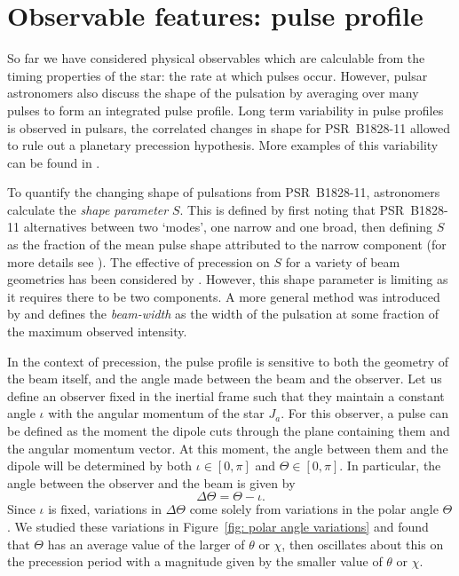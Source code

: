 \documentclass[../full_thesis/full_thesis.tex]{subfiles}
\begin{document}
\section{Observable features: pulse profile}
\label{sec: observable features: shape}

So far we have considered physical observables which are calculable from the
timing properties of the star: the rate at which pulses occur. However, pulsar
astronomers also discuss the shape of the pulsation by averaging over many
pulses to form an integrated pulse profile.  Long term variability in pulse
profiles is observed in pulsars, the correlated changes in shape for
PSR~B1828-11 allowed \citet{Stairs2000} to rule out a planetary precession
hypothesis. More examples of this variability can be found in \citet{Lyne2010}.

To quantify the changing shape of pulsations from PSR~B1828-11, astronomers
calculate the \emph{shape parameter} $S$. This is defined by first noting that
PSR~B1828-11 alternatives between two `modes', one narrow and one broad, then
defining $S$ as the fraction of the mean pulse shape attributed to the narrow
component (for more details see \citet{Stairs2003}). The effective of
precession on $S$ for a variety of beam geometries has been considered by
\citet{Akgun2006}.  However, this shape parameter is limiting as it requires
there to be two components.  A more general method was introduced by
\citet{Lyne2010} and defines the \emph{beam-width} as the width of the
pulsation at some fraction of the maximum observed intensity.

In the context of precession, the pulse profile is sensitive to both the
geometry of the beam itself, and the angle made between the beam and the
observer.  Let us define an observer fixed in the inertial frame such that they
maintain a constant angle $\iota$ with the angular momentum of the star $J_a$.
For this observer, a pulse can be defined as the moment the dipole cuts through
the plane containing them and the angular momentum vector. At this moment, the
angle between them and the dipole will be determined by both $\iota \in [0, \pi]$ and
$\Theta \in [0, \pi]$. In particular, the angle between the observer and the beam
is given by
\begin{equation}
\Delta\Theta = \Theta - \iota.
\label{eqn: delta Theta}
\end{equation}
Since $\iota$ is fixed, variations in $\Delta\Theta$ come solely from
variations in the polar angle $\Theta$. We studied these variations in
Figure~\ref{fig: polar angle variations} and found that $\Theta$ has an
average value of the larger of $\theta$ or $\chi$, then oscillates about this
on the precession period with a magnitude given by the smaller value of
$\theta$ or $\chi$.
\end{document}
